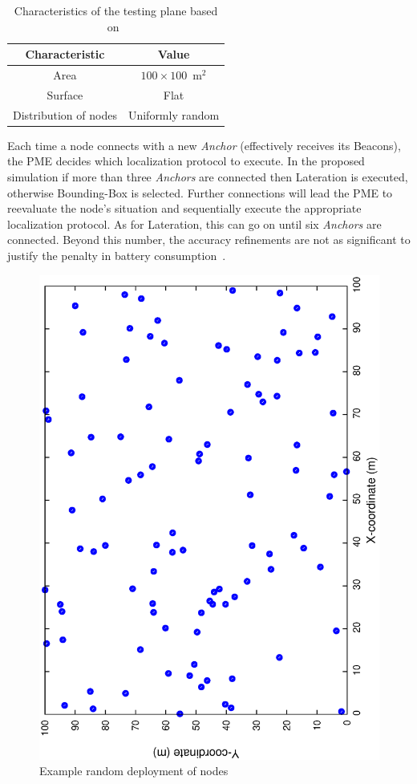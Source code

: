 \begin{table}[htbp]
  \centering
  \begin{threeparttable}[t]
  \caption{Characteristics of the testing plane based on~\cite{convexEstimation,fieldDimmensions}}
  \label{tab:testingPlanes}
  \begin{tabular}{c||c}
  \hline
  \bfseries Characteristic & \bfseries Value\\
  \hline\hline
  Area & $100\times100$~m$^{2}$\\
  Surface & Flat\\
  Distribution of nodes & Uniformly random\\
  \hline
  \end{tabular}
  \end{threeparttable} 
\end{table}

Each time a node connects with a new \emph{Anchor} (effectively receives its Beacons), the PME decides which localization protocol to execute. In the proposed simulation if more than three \emph{Anchors} are connected then Lateration is executed, otherwise Bounding-Box is selected. Further connections will lead the PME to reevaluate the node's situation and sequentially execute the appropriate localization protocol. As for Lateration, this can go on until six \emph{Anchors} are connected. Beyond this number, the accuracy refinements are not as significant to justify the penalty in battery consumption~\cite{beaconLimits}.

\begin{figure}[htbp]
  \centering
  \includegraphics[width=0.7\linewidth, angle = -90]{section4/figures/topology.eps}
  \caption{Example random deployment of nodes
  \label{fig:topology}}
\end{figure}

